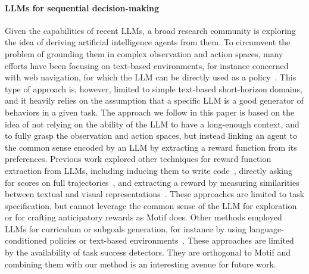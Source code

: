 \documentclass{article} %
\begin{document}
\paragraph{LLMs for sequential decision-making} 
Given the capabilities of recent LLMs, a broad research community is exploring the idea of deriving artificial intelligence agents from them.
To circumvent the problem of grounding them in complex observation and action spaces, many efforts have been focusing on text-based environments, for instance concerned with web navigation, for which the LLM can be directly used as a policy~\citep{deng2023mind2web,shaw2023pixels,kim2023language,yao2022react,wu2023spring}.
This type of approach is, however, limited to simple text-based short-horizon domains, and it heavily  relies on the assumption that a specific LLM is a good generator of behaviors in a given task.
The approach we follow in this paper is based on the idea of not relying on the ability of the LLM to have a long-enough context, and to fully grasp the observation and action spaces, but instead linking an agent to the common sense encoded by an LLM by extracting a reward function from its preferences.
Previous work explored other techniques for reward function extraction from LLMs, including inducing them to write code~\citep{yu2023language}, directly asking for scores on full trajectories~\citep{kwon2022reward}, and extracting a reward by measuring similarities between textual and visual representations~\citep{di2023towards,Cui2022,adeniji2023language,Fan2022,Mahmoudieh2022,MaK2023,DBLP:conf/icml/DuWWCDA0A23, lifshitz2023steve1}.
These approaches are limited to task specification, but cannot leverage the common sense of the LLM for exploration or for crafting anticipatory rewards as Motif does.
Other methods employed LLMs for curriculum or subgoals generation, for instance by using language-conditioned policies or text-based environments~\citep{Huang2022,zhang2023omni,wang2023voyager,wu2023spring,Ichter2022,mirchandani2021ella}.
These approaches are limited by the availability of task success detectors. They are orthogonal to Motif and combining them with our method is an interesting avenue for future work.
\end{document}
